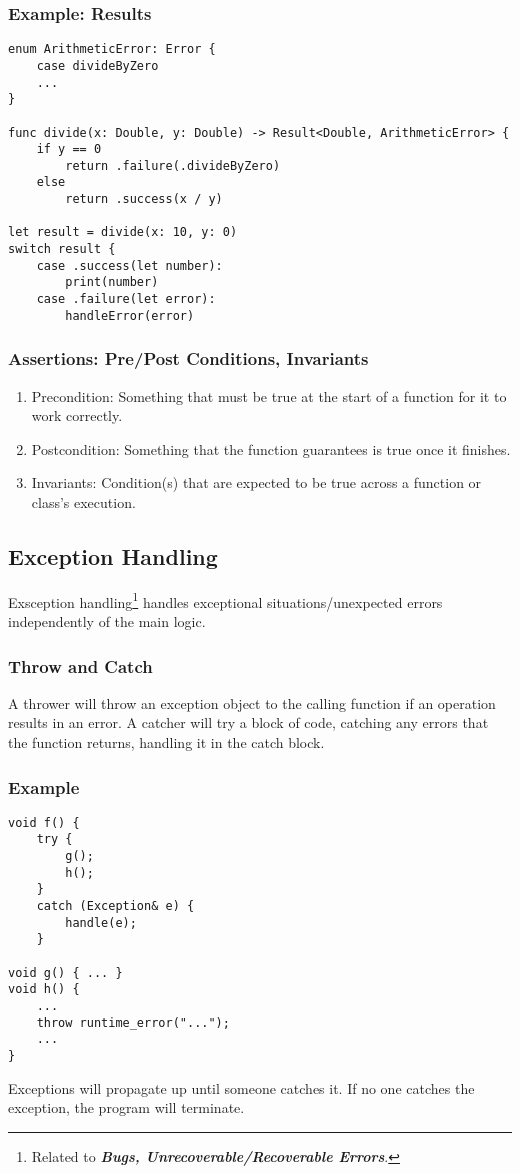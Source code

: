 \documentclass{article}
\begin{document}
\subsubsection*{Example: Results}
\begin{verbatim}
enum ArithmeticError: Error {
    case divideByZero
    ...
}

func divide(x: Double, y: Double) -> Result<Double, ArithmeticError> {
    if y == 0
        return .failure(.divideByZero)
    else
        return .success(x / y)

let result = divide(x: 10, y: 0)
switch result {
    case .success(let number):
        print(number)
    case .failure(let error):
        handleError(error)
\end{verbatim}

\subsubsection*{Assertions: Pre/Post Conditions, Invariants}
\begin{enumerate}[label=(\roman*)]
\item Precondition: Something that must be true at the start of a
  function for it to work correctly.
\item Postcondition: Something that the function guarantees is true
  once it finishes.
\item Invariants: Condition(s) that are expected to be true across a
  function or class's execution.
\end{enumerate}

\subsection{Exception Handling}
Exsception handling\footnote{Related to \textit{\textbf{Bugs,
      Unrecoverable/Recoverable Errors}}.} handles exceptional
situations/unexpected errors independently of the main logic.
\subsubsection{Throw and Catch}
A thrower will throw an exception object to the calling function if an operation
results in an error. A catcher will try a block of code, catching any
errors that the function returns, handling it in the catch block.
\subsubsection*{Example}
\begin{verbatim}
void f() {
    try {
        g();
        h();
    }
    catch (Exception& e) {
        handle(e);
    }

void g() { ... }
void h() {
    ...
    throw runtime_error("...");
    ...
}
\end{verbatim}
Exceptions will propagate up until someone catches it. If no one
catches the exception, the program will terminate.
\end{document}

